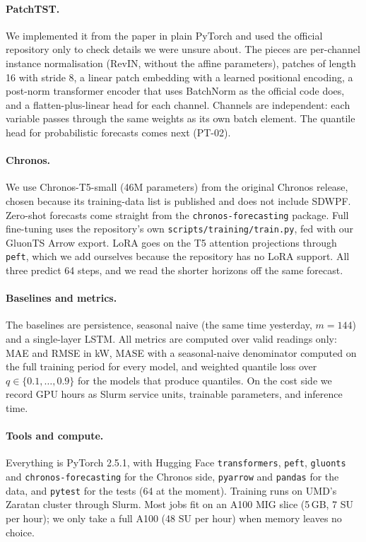 \documentclass[11pt]{article}
\newcommand{\code}[1]{\texttt{\small #1}}
\begin{document}
\paragraph{PatchTST.} We implemented it from the paper in plain PyTorch and used the official repository only to
check details we were unsure about. The pieces are per-channel instance normalisation (RevIN, without the affine
parameters), patches of length 16 with stride 8, a linear patch embedding with a learned positional encoding, a
post-norm transformer encoder that uses BatchNorm as the official code does, and a flatten-plus-linear head for
each channel. Channels are independent: each variable passes through the same weights as its own batch element.
The quantile head for probabilistic forecasts comes next (PT-02).

\paragraph{Chronos.} We use Chronos-T5-small (46M parameters) from the original Chronos release, chosen because
its training-data list is published and does not include SDWPF. Zero-shot forecasts come straight from the
\code{chronos-forecasting} package. Full fine-tuning uses the repository's own \code{scripts/training/train.py},
fed with our GluonTS Arrow export. LoRA goes on the T5 attention projections through \code{peft}, which we add
ourselves because the repository has no LoRA support. All three predict 64 steps, and we read the shorter horizons
off the same forecast.

\paragraph{Baselines and metrics.} The baselines are persistence, seasonal naive (the same time yesterday,
$m = 144$) and a single-layer LSTM. All metrics are computed over valid readings only: MAE and RMSE in kW, MASE
with a seasonal-naive denominator computed on the full training period for every model, and weighted quantile loss
over $q \in \{0.1, \ldots, 0.9\}$ for the models that produce quantiles. On the cost side we record GPU hours as
Slurm service units, trainable parameters, and inference time.

\paragraph{Tools and compute.}\sloppy Everything is PyTorch 2.5.1, with Hugging Face \code{transformers},
\code{peft}, \code{gluonts} and \code{chronos-forecasting} for the Chronos side, \code{pyarrow} and \code{pandas} for
the data, and \code{pytest} for the tests (64 at the moment). Training runs on UMD's Zaratan cluster through
Slurm. Most jobs fit on an A100 MIG slice (5\,GB, 7 SU per hour); we only take a full A100 (48 SU per hour) when
memory leaves no choice.
\end{document}
